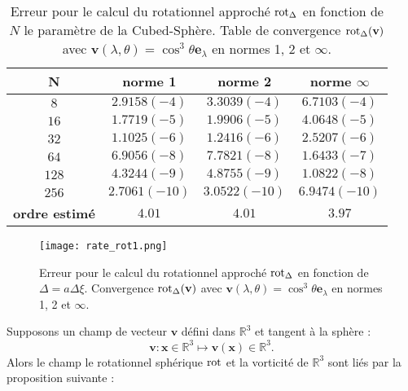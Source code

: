 \begin{table}[htbp]
\begin{center}
\begin{tabular}{|c||c|c|c|}
\hline
\textbf{N}  & \textbf{norme 1} & \textbf{norme 2} & \textbf{norme $\infty$} \\
\hline
\hline
$8$  & $2.9158(-4)$  & $3.3039(-4)$  & $6.7103(-4)$  \\
$16$ & $1.7719(-5)$  & $1.9906(-5)$  & $4.0648(-5)$  \\
$32$ & $1.1025(-6)$  & $1.2416(-6)$  & $2.5207(-6)$  \\
$64$ & $6.9056(-8)$  & $7.7821(-8)$  & $1.6433(-7)$  \\
$128$& $4.3244(-9)$  & $4.8755(-9)$  & $1.0822(-8)$  \\
$256$& $2.7061(-10)$ & $3.0522(-10)$ & $6.9474(-10)$ \\
\hline 
\hline
\textbf{ordre estimé}& $4.01$ & $4.01$ & $3.97$\\
\hline
\end{tabular}
\end{center}
\caption{Erreur pour le calcul du rotationnel approché $\text{rot}_{\Delta}$ en fonction de $N$ le paramètre de la Cubed-Sphère. Table de convergence $\text{rot}_{\Delta} ( \mathbf{v} )$ avec $\mathbf{v} ( \lambda, \theta ) = \cos^3 \theta \mathbf{e}_{\lambda}$ en normes 1, 2 et $\infty$.}
\label{tab:rate_rot1}
\end{table} 

\begin{figure}[htbp]
\begin{center}
\texttt{[image: rate\_rot1.png]}
\end{center}
\caption{Erreur pour le calcul du rotationnel approché $\text{rot}_{\Delta}$ en fonction de $\Delta = a \Delta \xi$. Convergence $\text{rot}_{\Delta} ( \mathbf{v} )$ avec $\mathbf{v} ( \lambda, \theta ) = \cos^3 \theta \mathbf{e}_{\lambda}$ en normes 1, 2 et $\infty$.}
\label{fig:rate_rot1}
\end{figure}


Supposons un champ de vecteur $\mathbf{v}$ défini dans $\mathbb{R}^3$ et tangent à la sphère :
\begin{equation}
\mathbf{v} : \mathbf{x} \in \mathbb{R}^3 \mapsto \mathbf{v}(\mathbf{x}) \in \mathbb{R}^3.
\end{equation}
Alors le champ le rotationnel sphérique $\text{rot}$ et la vorticité de $\mathbb{R}^3$ sont liés par la proposition suivante :

